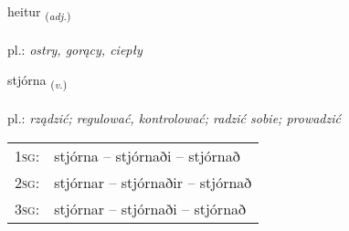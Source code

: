\documentclass[frontgrid, backgrid]{flacards}\usepackage[]{graphicx}\usepackage[]{xcolor}
\begin{document}
\renewcommand{\flhead}{\vskip5pt \fboxsep=0pt {\small\bfseries\footnotesize Lýsingarorð | przymiotnik}}
\renewcommand{\fcfoot}{\vskip5pt \fboxsep=0pt \hspace{2pt}{\small\bfseries\footnotesize 1K}}

\renewcommand{\blhead}{\vskip5pt {\small\bfseries\footnotesize Lýsingarorð | przymiotnik }}
\renewcommand{\bcfoot}{\vskip5pt \hspace{2pt}{\small\bfseries\footnotesize 1K}}


{heitur \small{\textsubscript{(\textit{adj.})}} \\[1ex] %
\textphonetic{[heiːtʏr]} \\
pl.: \emph{ostry, gorący, ciepły} \\  [2ex]
\renewcommand*{\arraystretch}{0.8}
}

\renewcommand{\flhead}{\vskip5pt \fboxsep=0pt {\small\bfseries\footnotesize Sagnorð | czasownik}}
\renewcommand{\fcfoot}{\vskip5pt \fboxsep=0pt \hspace{2pt}{\small\bfseries\footnotesize 1K}}

\renewcommand{\blhead}{\vskip5pt {\small\bfseries\footnotesize Sagnorð | czasownik }}
\renewcommand{\bcfoot}{\vskip5pt \hspace{2pt}{\small\bfseries\footnotesize 1K}}


{stjórna \small{\textsubscript{(\textit{v.})}} \\[1ex] %
\textphonetic{[stjourtna]} \\
pl.: \emph{rządzić; regulować, kontrolować; radzić sobie; prowadzić} \\  [2ex]
\renewcommand*{\arraystretch}{0.8}
\begin{tabular}{p{1cm}l}
\textsc{1sg}: & stjórna -- stjórnaði -- stjórnað \\ 
\textsc{2sg}: & stjórnar -- stjórnaðir -- stjórnað \\ 
\textsc{3sg}: & stjórnar -- stjórnaði -- stjórnað \\ 
\end{tabular}
}
\end{document}
